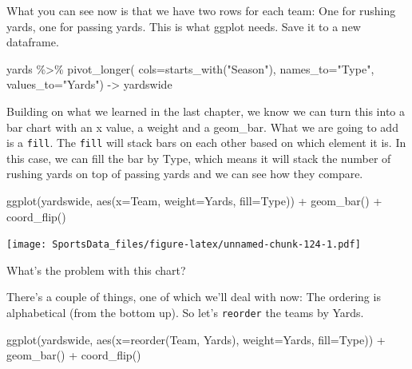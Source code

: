 \documentclass[
]{book}
\newenvironment{Shaded}{\begin{snugshade}}{\end{snugshade}}
\newcommand{\AttributeTok}[1]{\textcolor[rgb]{0.77,0.63,0.00}{#1}}
\newcommand{\FunctionTok}[1]{\textcolor[rgb]{0.00,0.00,0.00}{#1}}
\newcommand{\NormalTok}[1]{#1}
\newcommand{\OtherTok}[1]{\textcolor[rgb]{0.56,0.35,0.01}{#1}}
\newcommand{\SpecialCharTok}[1]{\textcolor[rgb]{0.00,0.00,0.00}{#1}}
\newcommand{\StringTok}[1]{\textcolor[rgb]{0.31,0.60,0.02}{#1}}
\begin{document}
What you can see now is that we have two rows for each team: One for rushing yards, one for passing yards. This is what ggplot needs. Save it to a new dataframe.

\begin{Shaded}
\begin{Highlighting}[]
\NormalTok{yards }\SpecialCharTok{\%\textgreater{}\%} 
  \FunctionTok{pivot\_longer}\NormalTok{(}
    \AttributeTok{cols=}\FunctionTok{starts\_with}\NormalTok{(}\StringTok{"Season"}\NormalTok{), }
    \AttributeTok{names\_to=}\StringTok{"Type"}\NormalTok{, }
    \AttributeTok{values\_to=}\StringTok{"Yards"}\NormalTok{) }\OtherTok{{-}\textgreater{}}\NormalTok{ yardswide}
\end{Highlighting}
\end{Shaded}

Building on what we learned in the last chapter, we know we can turn this into a bar chart with an x value, a weight and a geom\_bar. What we are going to add is a \texttt{fill}. The \texttt{fill} will stack bars on each other based on which element it is. In this case, we can fill the bar by Type, which means it will stack the number of rushing yards on top of passing yards and we can see how they compare.

\begin{Shaded}
\begin{Highlighting}[]
\FunctionTok{ggplot}\NormalTok{(yardswide, }\FunctionTok{aes}\NormalTok{(}\AttributeTok{x=}\NormalTok{Team, }\AttributeTok{weight=}\NormalTok{Yards, }\AttributeTok{fill=}\NormalTok{Type)) }\SpecialCharTok{+} 
  \FunctionTok{geom\_bar}\NormalTok{() }\SpecialCharTok{+} 
  \FunctionTok{coord\_flip}\NormalTok{()}
\end{Highlighting}
\end{Shaded}

\texttt{[image: SportsData\_files/figure-latex/unnamed-chunk-124-1.pdf]}

What's the problem with this chart?

There's a couple of things, one of which we'll deal with now: The ordering is alphabetical (from the bottom up). So let's \texttt{reorder} the teams by Yards.

\begin{Shaded}
\begin{Highlighting}[]
\FunctionTok{ggplot}\NormalTok{(yardswide, }\FunctionTok{aes}\NormalTok{(}\AttributeTok{x=}\FunctionTok{reorder}\NormalTok{(Team, Yards), }\AttributeTok{weight=}\NormalTok{Yards, }\AttributeTok{fill=}\NormalTok{Type)) }\SpecialCharTok{+} 
  \FunctionTok{geom\_bar}\NormalTok{() }\SpecialCharTok{+} 
  \FunctionTok{coord\_flip}\NormalTok{()}
\end{Highlighting}
\end{Shaded}
\end{document}
